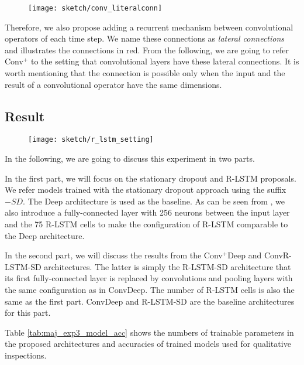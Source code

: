  \begin{figure}
\centering
\texttt{[image: sketch/conv\_literalconn]}
\label{fig:conv_literalconn}
\end{figure}

	Therefore, we also propose adding a recurrent mechanism between convolutional operators of each time step. We name these connections as \textit{lateral connections} and \addfigure{\ref{fig:conv_literalconn}} illustrates the connections in red. From the following, we are going to refer Conv$^+$ to the setting that convolutional layers have these  lateral connections.  It is worth mentioning that the connection is possible only when the input and the result of a convolutional operator have the same dimensions.

\subsection{Result}

\begin{figure}
\centering
\texttt{[image: sketch/r\_lstm\_setting]}
\label{fig:rlstm_setting}
\end{figure}

In the following, we are going to discuss this experiment in two parts.

In the first part, we will focus on the stationary dropout and R-LSTM proposals. We refer models trained with the stationary dropout approach using the suffix $-SD$. The Deep architecture is used as the baseline.  As can be seen from \addfigure{\ref{fig:rlstm_setting}}, we also introduce a fully-connected layer with 256 neurons between the input layer and the 75 R-LSTM cells to make the configuration of R-LSTM comparable to the Deep architecture.


In the second part, we will discuss the results from the Conv$^+$Deep and ConvR-LSTM-SD architectures. The latter  is simply the R-LSTM-SD architecture that its first fully-connected layer is replaced by convolutions and pooling layers with the same configuration as in ConvDeep. The number of R-LSTM cells is also the same as the first part. ConvDeep and R-LSTM-SD are the baseline architectures for this part.


Table \ref{tab:maj_exp3_model_acc} shows the numbers of trainable parameters in the proposed architectures and accuracies of trained models used for qualitative inspections.

